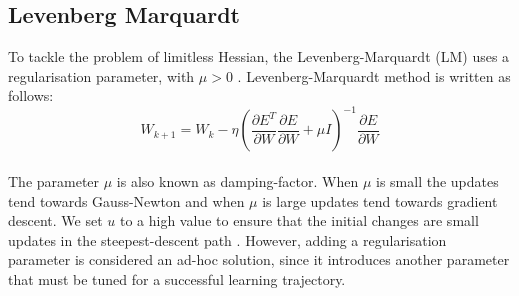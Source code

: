 \documentclass[journal]{IEEEtran}
\begin{document}
\subsection{Levenberg Marquardt }
To tackle the problem of limitless Hessian, the Levenberg-Marquardt (LM) uses a regularisation parameter, with $\mu > 0$ . Levenberg-Marquardt method is written as follows: \\
$$ W_{k+1}=W_{k}-\eta\left(\frac{\partial E^{T}}{\partial W} \frac{\partial E}{\partial W}+\mu I\right)^{-1} \frac{\partial E}{\partial W} $$ \\
The parameter $\mu$ is also known as damping-factor.
When $\mu$ is small the updates tend towards Gauss-Newton and when  $\mu$ is large updates tend towards gradient descent. We set $u$ to a high value to ensure that the initial changes are small updates in the steepest-descent path \cite{gavin2019levenberg}.
However, adding a regularisation parameter is considered an ad-hoc solution, since it introduces another parameter that must be tuned for a successful learning trajectory.



\end{document}
